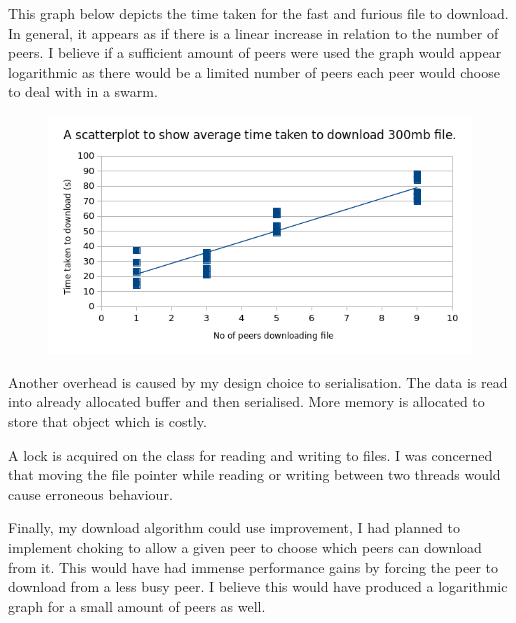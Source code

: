 \documentclass{article}
\begin{document}
This graph below depicts the time taken for the fast and furious file to download. In general, it appears as if there is a linear increase in relation to the number of peers. I believe if a sufficient amount of peers were used the graph would appear logarithmic as there would be a limited number of peers each peer would choose to deal with in a swarm.

\begin{figure}[!htb]
\centering
\includegraphics[scale=0.50]{images/graph.png}
\end{figure}

Another overhead is caused by my design choice to serialisation. The data is read into already allocated buffer and then serialised. More memory is allocated to store that object which is costly. 

A lock is acquired on the class for reading and writing to files. I was concerned that moving the file pointer while reading or writing between two threads would cause erroneous behaviour.

Finally, my download algorithm could use improvement, I had planned to implement choking to allow a given peer to choose which peers can download from it. This would have had immense performance gains by forcing the peer to download from a less busy peer. I believe this would have produced a logarithmic graph for a small amount of peers as well.
\end{document}
